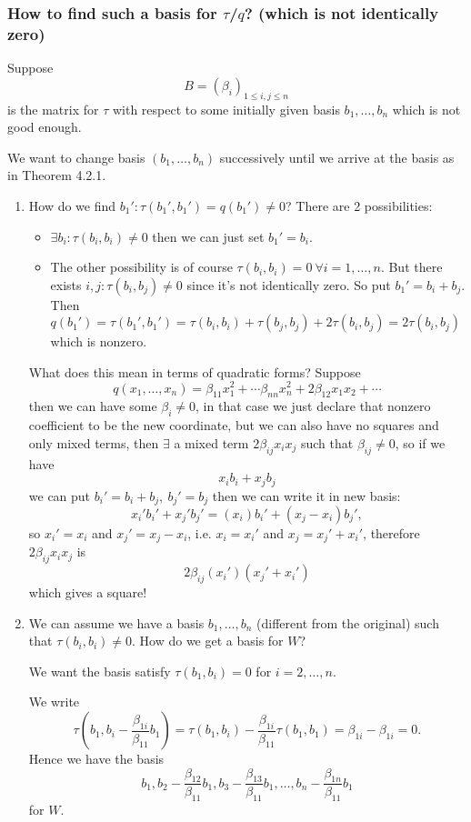 \documentclass[a4paper]{article}
\theoremstyle{definition}
\begin{document}
\subsubsection{How to find such a basis for $\tau$/$q$? (which is not identically zero)}
Suppose
\[
B=(\beta_i)_{1\leq i,j \leq n}
\]
is the matrix for $\tau$ with respect to some initially given basis $b_1,\ldots,b_n$ which is not good enough.

We want to change basis $(b_1,\ldots,b_n)$ successively until we arrive at the basis as in Theorem 4.2.1.
\begin{enumerate}
\item How do we find $b_1' : \tau (b_1',b_1') =q(b_1')\neq 0$? There are 2 possibilities:\begin{itemize}
    \item $\exists b_i : \tau (b_i,b_i)\neq 0$ then we can just set $b_1'=b_i$.
    \item The other possibility is of course $\tau (b_i,b_i)=0 \ \forall i=1,\ldots,n$. But there exists $i,j: \tau (b_i,b_j) \neq 0$ since it's not identically zero. So put $b_1'=b_i+b_j$. Then $q(b_1')=\tau (b_1',b_1')=\tau(b_i,b_i)+\tau (b_j,b_j) + 2\tau (b_i,b_j)=2\tau (b_i,b_j)$ which is nonzero.
\end{itemize}
What does this mean in terms of quadratic forms? Suppose
\[
q(x_1,\ldots,x_n)=\beta_{11} x_1^2+\cdots \beta_{nn} x_n^2+2\beta_{12}x_1x_2+\cdots
\]
then we can have some $\beta_i \neq 0$, in that case we just declare that nonzero coefficient to be the new coordinate, but we can also have no squares and only mixed terms, then $\exists$ a mixed term $2\beta_{ij}x_ix_j$ such that $\beta_{ij}\neq 0$, so if we have
\[
x_i b_i+x_jb_j
\]
we can put $b_i'=b_i+b_j,\ b_j'=b_j$ then we can write it in new basis:
\[
x_i' b_i'+x_j' b_j' = (x_i)b_i'+(x_j-x_i)b_j',
\]
so $x_i'=x_i$ and $x_j'=x_j-x_i$, i.e. $x_i=x_i'$ and $x_j=x_j'+x_i'$, therefore $2\beta_{ij}x_ix_j$ is
\[
2\beta_{ij} (x_i')(x_j'+x_i')
\]
which gives a square!
\item We can assume we have a basis $b_1,\ldots,b_n$ (different from the original) such that $\tau (b_i,b_i)\neq 0$. How do we get a basis for $W$?

We want the basis satisfy $\tau (b_1,b_i)=0$ for $i=2,\ldots,n$.

We write
\[
\tau \left(b_1,b_i-\frac{\beta_{1i}}{\beta_{11}}b_1 \right)=\tau(b_1,b_i)-\frac{\beta_{1i}}{\beta_{11}} \tau (b_1,b_1) = \beta_{1i}-\beta_{1i}=0 .
\]
Hence we have the basis
\[
b_1,b_2-\frac{\beta_{12}}{\beta_{11}}b_1,b_3-\frac{\beta_{13}}{\beta_{11}}b_1,\ldots,b_n-\frac{\beta_{1n}}{\beta_{11}}b_1
\]
for $W$.


\end{enumerate}
\end{document}
